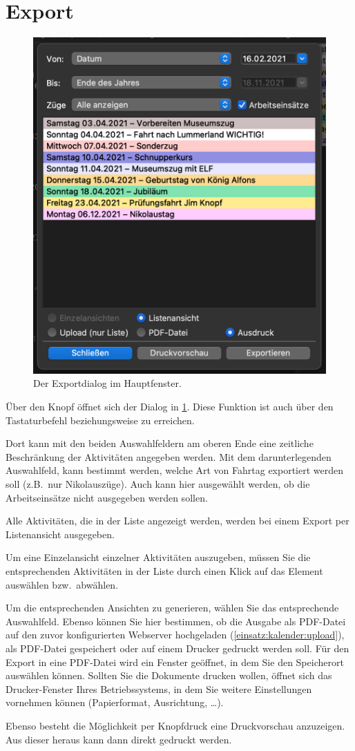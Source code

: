 \section{Export}\label{einsatz:kalender:export}
\begin{figure}[!h]
  \centering
	\includegraphics[width=.5\textwidth]{img/export}
	\caption{Der Exportdialog im Hauptfenster.}
	\label{fig:einsatz:kalender:export}
\end{figure}
Über den Knopf  öffnet sich der Dialog in \cref{fig:einsatz:kalender:export}.
Diese Funktion ist auch über den Tastaturbefehl  beziehungsweise  zu erreichen.

Dort kann mit den beiden Auswahlfeldern am oberen Ende eine zeitliche Beschränkung der Aktivitäten angegeben werden.
Mit dem darunterlegenden Auswahlfeld, kann bestimmt werden, welche Art von Fahrtag exportiert werden soll (z.B.\ nur Nikolauszüge).
Auch kann hier ausgewählt werden, ob die Arbeitseinsätze nicht ausgegeben werden sollen.

Alle Aktivitäten, die in der Liste angezeigt werden, werden bei einem Export per Listenansicht ausgegeben.

Um eine Einzelansicht einzelner Aktivitäten auszugeben, müssen Sie die entsprechenden Aktivitäten in der Liste durch einen Klick auf das Element auswählen bzw.\ abwählen.

Um die entsprechenden Ansichten zu generieren,
wählen Sie das entsprechende Auswahlfeld.
Ebenso können Sie hier bestimmen, ob die Ausgabe als PDF-Datei auf den zuvor konfigurierten Webserver hochgeladen (\cref{einsatz:kalender:upload}),
als PDF-Datei gespeichert oder auf einem Drucker gedruckt werden soll.
Für den Export in eine PDF-Datei wird ein Fenster geöffnet, in dem Sie den Speicherort auswählen können.
Sollten Sie die Dokumente drucken wollen,
öffnet sich das Drucker-Fenster Ihres Betriebssystems,
in dem Sie weitere Einstellungen vornehmen können (Papierformat, Ausrichtung, \dots).
\begin{neu}
Ebenso besteht die Möglichkeit per Knopfdruck eine Druckvorschau anzuzeigen.
Aus dieser heraus kann dann direkt gedruckt werden.
\end{neu}

